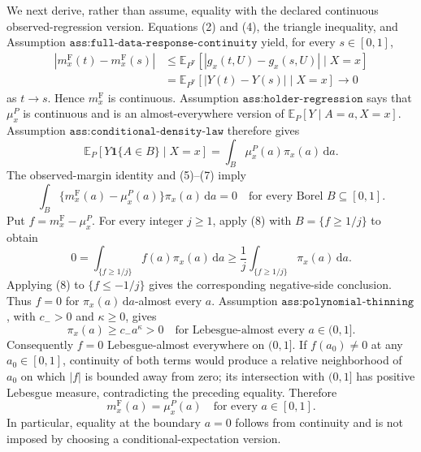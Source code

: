 We next derive, rather than assume, equality with the declared continuous observed-regression version.  Equations (2) and (4), the triangle inequality, and Assumption \(\texttt{ass:full-data-response-continuity}\) yield, for every \(s\in[0,1]\),
\[
\begin{aligned}
 |m_x^{\mathrm F}(t)-m_x^{\mathrm F}(s)|
 &\leq\mathbb E_{P^{\mathrm F}}
   [|g_x(t,U)-g_x(s,U)|\mid X=x]\\
 &=\mathbb E_{P^{\mathrm F}}
   [|Y(t)-Y(s)|\mid X=x]
 \longrightarrow0
\end{aligned}
\tag{6}
\]
as \(t\to s\).  Hence \(m_x^{\mathrm F}\) is continuous.  Assumption \(\texttt{ass:holder-regression}\) says that \(\mu_x^P\) is continuous and is an almost-everywhere version of \(\mathbb E_P[Y\mid A=a,X=x]\).  Assumption \(\texttt{ass:conditional-density-law}\) therefore gives
\[
 \mathbb E_P[Y\mathbf 1\{A\in B\}\mid X=x]
 =\int_B\mu_x^P(a)\pi_x(a)\,\mathrm da.
 \tag{7}
\]
The observed-margin identity and (5)--(7) imply
\[
 \int_B\{m_x^{\mathrm F}(a)-\mu_x^P(a)\}\pi_x(a)\,\mathrm da=0
 \quad\text{for every Borel }B\subseteq[0,1].
 \tag{8}
\]
Put \(f=m_x^{\mathrm F}-\mu_x^P\).  For every integer \(j\geq1\), apply (8) with \(B=\{f\geq1/j\}\) to obtain
\[
 0=\int_{\{f\geq1/j\}}f(a)\pi_x(a)\,\mathrm da
 \geq \frac1j\int_{\{f\geq1/j\}}\pi_x(a)\,\mathrm da.
 \tag{9}
\]
Applying (8) to \(\{f\leq-1/j\}\) gives the corresponding negative-side conclusion.  Thus \(f=0\) for \(\pi_x(a)\,\mathrm da\)-almost every \(a\).  Assumption \(\texttt{ass:polynomial-thinning}\), with \(c_->0\) and \(\kappa\geq0\), gives
\[
 \pi_x(a)\geq c_-a^\kappa>0
 \quad\text{for Lebesgue-almost every }a\in(0,1].
 \tag{10}
\]
Consequently \(f=0\) Lebesgue-almost everywhere on \((0,1]\).  If \(f(a_0)\neq0\) at any \(a_0\in[0,1]\), continuity of both terms would produce a relative neighborhood of \(a_0\) on which \(|f|\) is bounded away from zero; its intersection with \((0,1]\) has positive Lebesgue measure, contradicting the preceding equality.  Therefore
\[
 m_x^{\mathrm F}(a)=\mu_x^P(a)
 \quad\text{for every }a\in[0,1].
 \tag{11}
\]
In particular, equality at the boundary \(a=0\) follows from continuity and is not imposed by choosing a conditional-expectation version.

